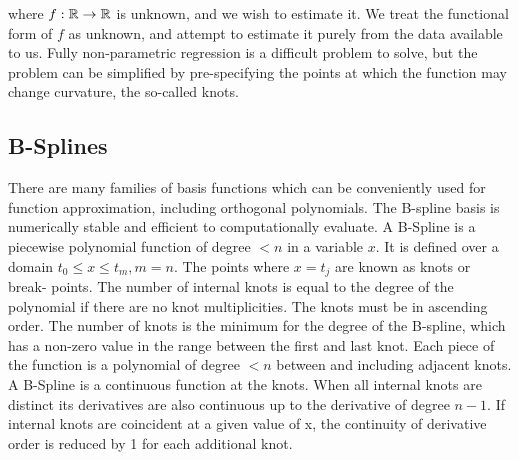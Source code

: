 \noindent where $f: {\mathbb{R}} \to {\mathbb{R}}$ is unknown, and we wish to estimate it. We treat the functional form of $f$ as
unknown, and attempt to estimate it purely from the data available to us. Fully non-parametric regression is a
difficult problem to solve, but the problem can be simplified by pre-specifying the points at which the
function may change curvature, the so-called knots.

\subsection{B-Splines}

There are many families of basis functions which can be conveniently used for function approximation,
including orthogonal polynomials. The B-spline basis \citep{DeBoor1972} is numerically stable and efficient to
computationally evaluate. A B-Spline is a piecewise polynomial function of degree $< n$ in a variable $x$. It
is defined over a domain $t_0 \leq x \leq t_m, m=n$. The points where $x = t_j$ are known as knots or break-
points. The number of internal knots is equal to the degree of the polynomial if there are no knot
multiplicities. The knots must be in ascending order. The number of knots is the minimum for the degree of the
B-spline, which has a non-zero value in the range between the first and last knot. Each piece of the function
is a polynomial of degree $< n$ between and including adjacent knots. A B-Spline is a continuous function at
the knots. When all internal knots are distinct its derivatives are also continuous up to the derivative of
degree $n - 1$. If internal knots are coincident at a given value of x, the continuity of derivative order is
reduced by 1 for each additional knot.

